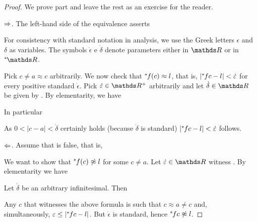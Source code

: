\begin{proof}
We prove part  and leave the rest as an exercise for the reader.

$\Rightarrow$.
The left-hand side of the equivalence  asserts



For consistency with standard notation in analysis, we use the Greek letters $\epsilon$ and $\delta$ as variables.
The symbols $\dot\epsilon$ e $\dot\delta$ denote parameters either in $\RR$ or in $\nsR$.

Pick $c\neq a\approx c$ arbitrarily.
We now check that ${}^*\kern-.2ex f(c)\approx l$, that is, $|{}^*\kern-.2ex fc-l|<\dot{\varepsilon}$ for every positive standard $\dot\epsilon$.
Pick $\dot\epsilon\in\RR^+$ arbitrarily and let $\dot\delta\in\RR$ be given by .
By elementarity, we have


In particular

\ceq{\hfill\ns\RR}{\models}{\phantom{\A\,\epsilon>0\ \E\,\delta>0\ \A x\ \Big[}0<|c-a|<\dot\delta\ \ \imp\ \ |fc-l|<\dot\epsilon.}

As $0<|c-a|<\dot\delta$ certainly holds (because $\dot\delta$ is standard) $|{}^*\kern-.2ex fc-l|<\dot{\varepsilon}$ follows.


$\Leftarrow$.
Assume that  is false, that is,


We want to show that ${}^*\kern-.2ex f(c)\not\approx l$ for some $c\neq a$.
Let $\dot\epsilon\in\RR$ witness .
By elementarity we have


Let $\dot\delta$ be an arbitrary infinitesimal.
Then 


Any $c$ that witnesses the above formula is such that $c\approx a\neq c$ and, simultaneously, $\varepsilon\le |{}^*\kern-.2ex fc-l|$.
But $\dot\epsilon$ is standard, hence ${}^*\kern-.2ex fc\not\approx l$.
\end{proof}


